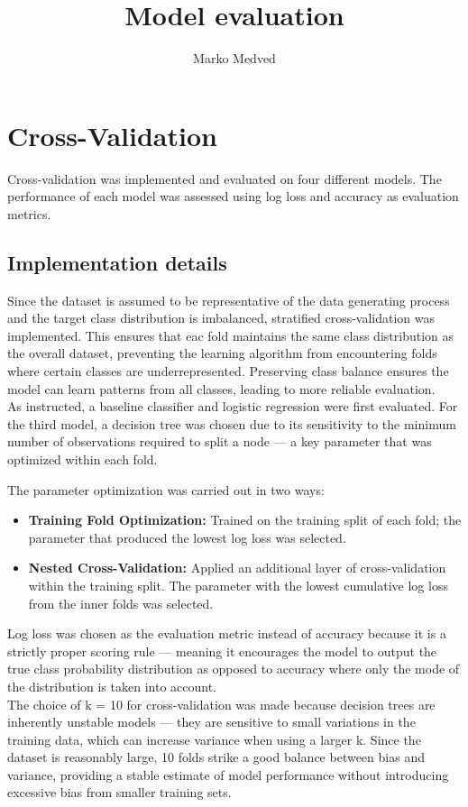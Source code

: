 \documentclass[9pt]{IEEEtran}
\title{\vspace{0ex}
Model evaluation}
\author{Marko Medved\vspace{-4.0ex}}
\begin{document}
\maketitle

\section{Cross-Validation}
Cross-validation was implemented and evaluated on four different models. 
The performance of each model was assessed using log loss and accuracy as
 evaluation metrics.
\subsection{Implementation details}
Since the dataset is assumed to be representative of the data generating process 
and the target class distribution
is imbalanced, stratified cross-validation was implemented. This ensures that eac
 fold maintains the same class distribution as the overall dataset, preventing the
  learning algorithm from encountering folds where certain classes are 
  underrepresented. Preserving class balance ensures the model can learn 
  patterns from all classes, leading to more reliable evaluation.
\\
As instructed, a baseline classifier and logistic regression were first
 evaluated. For the third model, a decision tree was chosen due to its 
 sensitivity to the minimum number of observations required to split a node —
  a key parameter that was optimized within each fold.

The parameter optimization was carried out in two ways:

\begin{itemize}
    \item \textbf{Training Fold Optimization:} Trained on the training split of each fold; the parameter that produced the lowest log loss was selected.
    \item \textbf{Nested Cross-Validation:} Applied an additional layer of cross-validation within the training split. The parameter with the lowest cumulative log loss from the inner folds was selected.
\end{itemize}

Log loss was chosen as the evaluation metric instead of accuracy because it
 is a strictly proper scoring rule — meaning it encourages the model to output
  the true class probability distribution as opposed to accuracy where only the mode of the distribution 
  is taken into account.
\\
The choice of k = 10 for cross-validation was made because decision trees are 
inherently unstable models — they are sensitive to small variations in the 
training data, which can increase variance when using a larger k. Since the
 dataset is reasonably large, 10 folds strike a good balance between bias and
  variance, providing a stable estimate of model performance without
   introducing excessive bias from smaller training sets.
\end{document}
